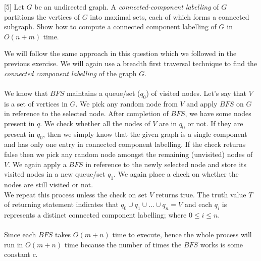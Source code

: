 \documentclass[addpoints]{exam}
\begin{document}
\begin{questions}
\begin{solution}
    \end{solution}
\pagebreak

  [5]
  Let $G$ be an undirected graph. A {\it connected-component labelling} of $G$ partitions the vertices of $G$ into maximal sets, each of which forms a connected subgraph. Show how to compute a connected component labelling of $G$ in $O(n + m)$ time.
  \begin{solution}
  	We will follow the same approach in this question which we followed in the previous exercise. We will again use a breadth first traversal technique to find the {\it connected component labelling} of the graph $G$. \\ \\
  	We know that $BFS$ maintains a queue/set ($q_0$) of visited nodes. Let's say that $V$ is a set of vertices in $G$. We pick any random node from $V$ and apply $BFS$ on $G$ in reference to the selected node. After completion of $BFS$, we have some nodes present in $q$. We check whether all the nodes of $V$ are in $q_0$ or not. If they are present in $q_0$, then we simply know that the given graph is a single component and has only one entry in connected component labelling. If the check returns false then we pick any random node amongst the remaining (unvisited) nodes of $V$. We again apply a $BFS$ in reference to the newly selected node and store its visited nodes in a new queue/set $q_1$. We again place a check on whether the nodes are still visited or not. \\
  	We repeat this process unless the check on set $V$ returns true. The truth value $T$ of returning statement indicates that $q_0 \cup q_1 \cup ... \cup q_n = V$ and each $q_i$ is represents a distinct connected component labelling; where $0 \leq i \leq n$.\\ \\
  	Since each $BFS$ takes $O(m+n)$ time to execute, hence the whole process will run in $O(m+n)$ time because the number of times the $BFS$ works is some constant $c$. 
  \end{solution}
\pagebreak


\end{questions}
\end{document}
